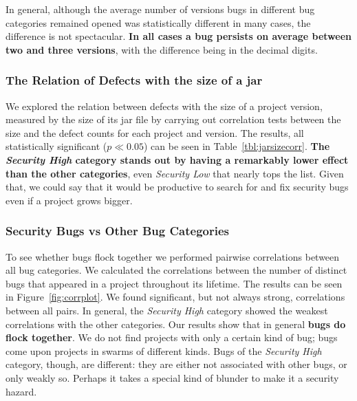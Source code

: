 \documentclass{sig-alternate}
\begin{document}
In general, although the average number of versions bugs in different
bug categories remained opened was statistically different in many
cases, the difference is not spectacular. \textbf{In all cases a bug persists
on average between two and three versions}, with the difference being
in the decimal digits.

\subsubsection{The Relation of Defects with the size of a {\sc jar}}

We explored the relation between defects with the size of a project
version, measured by the size of its {\sc jar} file by carrying out
correlation tests between the size and the defect counts for each
project and version. The results, all statistically significant ($p
\ll 0.05$) can be seen in Table~\ref{tbl:jarsizecorr}.  \textbf{The {\it
  Security High} category stands out by having a remarkably lower
effect than the other categories}, even {\it Security Low} that nearly
tops the list.
Given that, we could say that it would be productive to search for and fix
security bugs even if a project grows bigger.

\subsubsection{Security Bugs {\sc vs} Other Bug Categories}

To see whether bugs flock together we performed pairwise correlations
between all bug categories. We calculated the correlations between the
number of distinct bugs that appeared in a project throughout its
lifetime. The results can be seen in %
Figure~\ref{fig:corrplot}. We found significant, but not always
strong, correlations between all pairs. In general, the {\it Security
  High} category showed the weakest correlations with the other
categories. Our results show that in general \textbf{bugs do flock together}.
We do not find projects with only a certain kind of bug; bugs come
upon projects in swarms of different kinds. Bugs of the {\it Security
  High} category, though, are different: they are either not
associated with other bugs, or only weakly so. Perhaps it takes a
special kind of blunder to make it a security hazard.

%    
\end{document}
